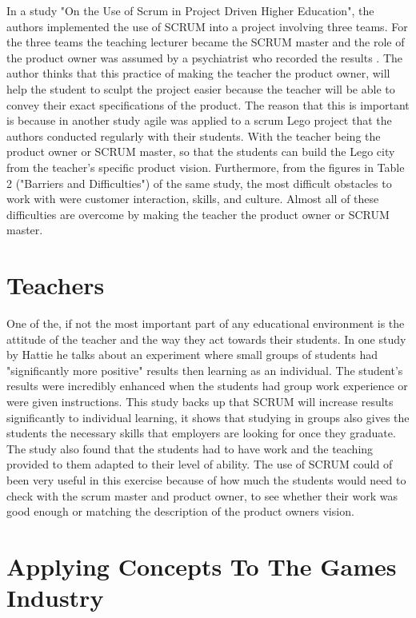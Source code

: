 \documentclass[11pt]{scrartcl}
\begin{document}
In a study "On the Use of Scrum in Project Driven Higher Education", the authors implemented the use of SCRUM into a project involving three teams. For the three teams the teaching lecturer became the SCRUM master and the role of the product owner was assumed by a psychiatrist who recorded the results \cite{persson2011use}. The author thinks that this practice of making the teacher the product owner, will help the student to sculpt the project easier because the teacher will be able to convey their exact specifications of the product. The reason that this is important is because in another study \cite{kropp2016teaching} agile was applied to a scrum Lego project that the authors conducted regularly with their students. With the teacher being the product owner or SCRUM master, so that the students can build the Lego city from the teacher’s specific product vision. Furthermore, from the figures in Table 2 ("Barriers and Difficulties") of the same study, the most difficult obstacles to work with were customer interaction, skills, and culture. Almost all of these difficulties are overcome by making the teacher the product owner or SCRUM master.

\section{Teachers}

One of the, if not the most important part of any educational environment is the attitude of the teacher and the way they act towards their students. In one study by Hattie \cite{hattie2008visible} he talks about an experiment where small groups of students had "significantly more positive" results then learning as an individual. The student’s results were incredibly enhanced when the students had group work experience or were given instructions. This study backs up that SCRUM will increase results significantly to individual learning, it shows that studying in groups also gives the students the necessary skills that employers are looking for once they graduate. The study also found that the students had to have work and the teaching provided to them adapted to their level of ability. The use of SCRUM could of been very useful in this exercise because of how much the students would need to check with the scrum master and product owner, to see whether their work was good enough or matching the description of the product owners vision. 

\section{Applying Concepts To The Games Industry}
\end{document}

